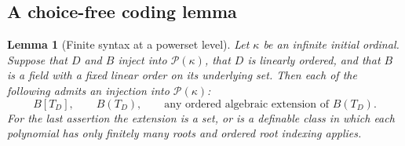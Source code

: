 \documentclass[11pt,letterpaper]{article}
\newtheorem{lemma}[lemma]{Lemma}\aliascntresetthe{lemma}
\theoremstyle{definition}
\theoremstyle{remark}
\newcommand{\Pow}{\mathcal P}
\begin{document}
\subsection{A choice-free coding lemma}
\begin{lemma}[Finite syntax at a powerset level]\label{hset:kw:lem:syntax}
Let $\kappa$ be an infinite initial ordinal. Suppose that $D$ and $B$ inject into $\Pow(\kappa)$, that $D$ is linearly ordered, and that $B$ is a field with a fixed linear order on its underlying set. Then each of the following admits an injection into $\Pow(\kappa)$:
\[
B[T_D],\qquad B(T_D),\qquad
\text{any ordered algebraic extension of }B(T_D).
\]
For the last assertion the extension is a set, or is a definable class in which each polynomial has only finitely many roots and ordered root indexing applies.
\end{lemma}
\end{document}
